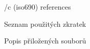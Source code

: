 \bibchap
    \usebib/c (iso690) references

\app Seznam použitých zkratek
    \makeglos

\app Popis přiložených souborů
